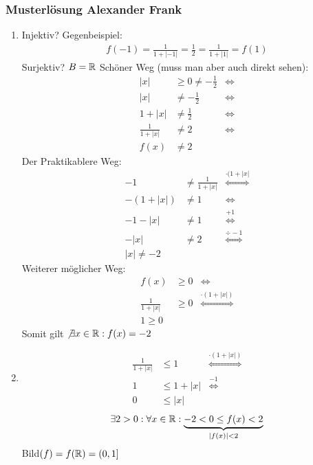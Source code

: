 \subsubsection{Musterlösung Alexander Frank}

\begin{enumerate}[label=\alph*)]
    \item Injektiv?
    Gegenbeispiel:
    \begin{align*}
        f(-1) = \frac{1}{1 + |-1|} = \frac{1}{2} = \frac{1}{1 + |1|} = f(1)
    \end{align*}
    Surjektiv? $B = \mathbb R$
    Schöner Weg (muss man aber auch direkt sehen):
    \begin{align*}
        |x| &\geq 0 \neq -\frac{1}{2} & \Leftrightarrow\\
        |x| &\neq -\frac{1}{2} & \Leftrightarrow\\
        1 + |x| &\neq \frac{1}{2} & \Leftrightarrow\\
        \frac{1}{1 + |x|} &\neq 2 & \Leftrightarrow\\
        f(x) &\neq 2
    \end{align*}
    Der Praktikablere Weg:
    \begin{align*}
        -1 &\neq \frac{1}{1 + |x|} & \overset{\cdot (1 + |x| }{\Leftrightarrow}\\
        -(1 + |x|) &\neq 1 & \Leftrightarrow\\
        -1 - |x| &\neq 1 & \overset{+1}{\Leftrightarrow}\\
        - |x| &\neq 2 & \overset{\div -1}{\Leftrightarrow}\\
        |x| \neq -2
    \end{align*}
    Weiterer möglicher Weg:
    \begin{align*}
        f(x) &\geq 0 & \Leftrightarrow\\
        \frac{1}{1 + |x|} &\geq 0 & \overset{\cdot (1 + |x|)}{\Leftrightarrow}\\
        1 \geq 0
    \end{align*}
    Somit gilt $\not \exists x \in \mathbb R: f(x) = -2$
    
    \item \begin{align*}
        \frac{1}{1 + |x|} &\leq 1 & \overset{\cdot (1 + |x|)}{\Leftrightarrow}\\
        1 &\leq 1 + |x| & \overset{-1}{\Leftrightarrow}\\
        0 &\leq |x|
    \end{align*}
    \begin{align*}
        \exists 2 > 0 : \forall x \in \mathbb R : \underbrace{-2 < 0 \leq f(x) < 2}_{|f(x)| < 2}
    \end{align*}
    Bild$(f) = f(\mathbb R) = (0, 1]$
    

\end{enumerate}
